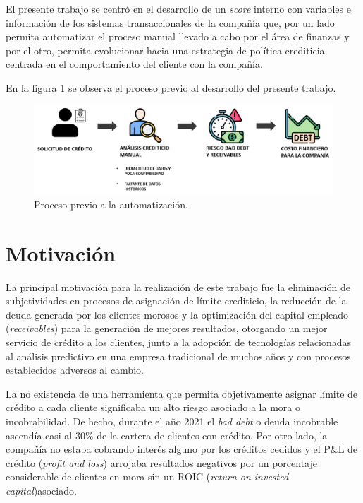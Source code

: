 El presente trabajo se centró en el desarrollo de un \textit{score} interno con variables e información de los sistemas transaccionales de la compañía que, por un lado permita automatizar el proceso manual llevado a cabo por el área de finanzas y por el otro, permita evolucionar hacia una estrategia de política crediticia centrada en el comportamiento del cliente con la compañía. 

En la figura \ref{fig:Proceso actual}  se observa el proceso previo al desarrollo del presente trabajo.

\vspace{1cm}
\begin{figure}[htbp]
	\centering
	\includegraphics[width=1.0\textwidth]{./Figures/Figura2.png}
	\caption{Proceso previo a la automatización.}
	\label{fig:Proceso actual}
\end{figure}
\vspace{1cm}



\section{Motivación}


La principal motivación para la realización de este trabajo fue la eliminación de subjetividades en procesos de asignación de límite crediticio, la reducción de la deuda generada por los clientes morosos y la optimización del capital empleado (\textit{receivables}) para la generación de mejores resultados, otorgando un mejor servicio de crédito a los clientes, junto a la adopción de tecnologías relacionadas al análisis predictivo en una empresa tradicional de muchos años y con procesos establecidos adversos al cambio.

La no existencia de una herramienta que permita objetivamente asignar límite de crédito a cada cliente significaba un alto riesgo asociado a la mora o incobrabilidad. De hecho, durante el año 2021 el \textit{bad debt} o deuda incobrable ascendía casi al 30\% de la cartera de clientes con crédito. Por otro lado, la compañía no estaba cobrando interés alguno por los créditos cedidos y el P\&L de crédito (\textit{profit and loss}) arrojaba resultados negativos por un porcentaje considerable de clientes en mora sin un ROIC (\textit{return on invested capital})asociado.

